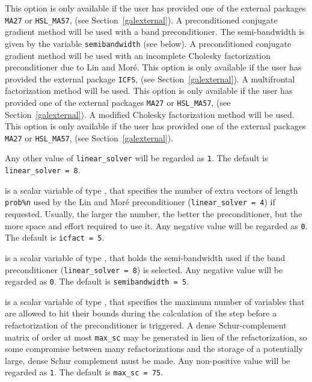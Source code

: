 \documentclass{galahad}
\begin{document}
\begin{description}
\begin{description}
    This option is only available if the user has provided one of the
    external packages {\tt MA27} or {\tt HSL\_MA57},
    (see Section~\ref{galexternal}).
    A preconditioned conjugate gradient
    method will be used with a band
    preconditioner. The semi-bandwidth
    is given by the variable {\tt semibandwidth} (see below).
    A preconditioned conjugate gradient
    method will be used with an incomplete Cholesky factorization
    preconditioner due to Lin and Mor\'{e}.
    This option is only
    available if the user has provided the external package {\tt ICFS},
    (see Section~\ref{galexternal}).
    A multifrontal factorization method will be used.
    This option is only available if the user has provided one of the
    external packages {\tt MA27} or {\tt HSL\_MA57},
    (see Section~\ref{galexternal}).
    A modified Cholesky factorization method will be used.
    This option is only available if the user has provided one of the
    external packages {\tt MA27} or {\tt HSL\_MA57},
    (see Section~\ref{galexternal}).
\end{description}
Any other value of {\tt linear\_solver} will be regarded as {\tt 1}.
The default is {\tt linear\_solver = 8}.

 is a scalar variable of type \integer, that specifies
the number of extra vectors of length {\tt prob\%n} used by the Lin and
Mor\'{e} preconditioner ({\tt linear\_solver = 4}) if requested.
Usually, the larger the number, the
better the preconditioner, but the more space and effort required to
use it. Any negative value will be regarded as {\tt 0}.
The default is {\tt icfact = 5}.

 is a scalar variable of type \integer, that holds
the semi-bandwidth used if the band preconditioner ({\tt linear\_solver = 8})
is selected. Any negative value will be regarded as {\tt 0}.
The default is {\tt semibandwidth = 5}.

 is a scalar variable of type \integer, that specifies
the maximum number of variables that are allowed to hit their bounds
during the calculation of the step before a refactorization of the
preconditioner is triggered. A dense Schur-complement matrix of order
at most {\tt max\_sc} may be generated in lieu of the refactorization, so
some compromise between many refactorizations and the storage of a potentially
large, dense Schur complement must be made.
Any non-positive value will be regarded as {\tt 1}.
The default is {\tt max\_sc = 75}.


\end{description}
\end{document}
